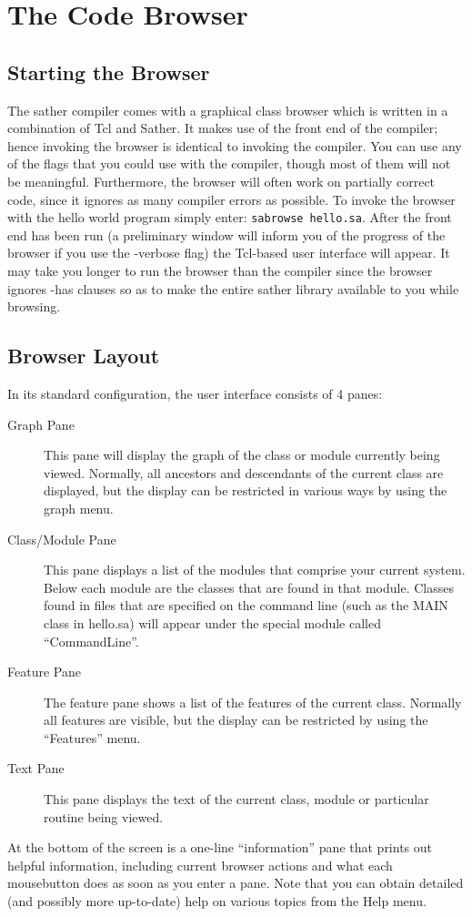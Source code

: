 \section{The Code Browser}
\subsection{Starting the Browser}
	The sather compiler comes with a graphical class browser which
is written in a combination of Tcl and Sather.  It makes use of the
front end of the compiler; hence invoking the browser is identical to
invoking the compiler.  You can use any of the flags that you could
use with the compiler, though most of them will not be meaningful.
Furthermore, the browser will often work on partially correct code,
since it ignores as many compiler errors as possible. To invoke the
browser with the hello world program simply enter:
{\tt sabrowse hello.sa}.  
	After the front end has been run (a preliminary window will
inform you of the progress of the browser if you use the -verbose
flag) the Tcl-based user interface will appear. It may take you
longer to run the browser than the compiler since the browser ignores
-has clauses so as to make the entire sather library available to
you while browsing.  

\subsection{Browser Layout}
	In its standard configuration, the user interface consists of
4 panes:
\begin{description}
\item [Graph Pane] This pane will display the graph of the class or module 
currently being viewed. Normally, all ancestors and descendants of the
current class are displayed, but the display can be restricted in various
ways by using the graph menu.
\item [Class/Module Pane] This pane displays a list of the modules that
comprise your current system. Below each module are the classes that
are found in that module. Classes found in files that are specified on
the command line (such as the MAIN class in hello.sa) will appear
under the special module called ``CommandLine''.
\item [Feature Pane] The feature pane shows a list of the features of the
current class. Normally all features are visible, but the display can be
restricted by using the ``Features'' menu.
\item [Text Pane] This pane displays the text of the current class, module or 
particular routine being viewed.
\end{description}
	At the bottom of the screen is a one-line ``information'' pane
that prints out helpful information, including current browser actions
and what each mousebutton does as soon as you enter a pane. Note that
you can obtain detailed (and possibly more up-to-date) help on various
topics from the Help menu.

